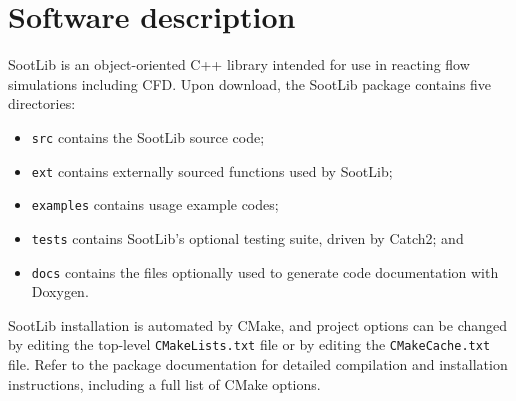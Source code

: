 \documentclass[preprint,letterpaper]{elsarticle}
\begin{document}

\section{Software description}
\label{s:architecture}

SootLib is an object-oriented C++ library intended for use in reacting flow simulations including CFD.
Upon download, the SootLib package contains five directories: 
%
\begin{itemize}
    \item \texttt{src} contains the SootLib source code; 
    \item \texttt{ext} contains externally sourced functions used by SootLib; 
    \item \texttt{examples} contains usage example codes; 
    \item \texttt{tests} contains SootLib's optional testing suite, driven by Catch2; and 
    \item \texttt{docs} contains the files optionally used to generate code documentation with Doxygen.
\end{itemize}
%
SootLib installation is automated by CMake, and project options can be changed by editing the top-level \texttt{CMakeLists.txt} file or by editing the \texttt{CMakeCache.txt} file. Refer to the package documentation for detailed compilation and installation instructions, including a full list of CMake options.
\end{document}
